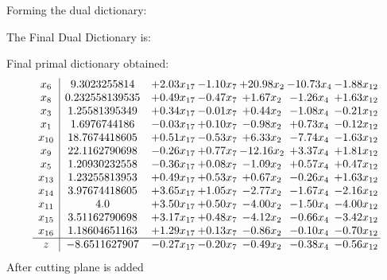 \documentclass[8pt]{article}
\begin{document}
Forming the dual dictionary:

The Final Dual Dictionary is: 

 Final primal dictionary obtained: 
\[\begin{array}{c| c c@{\hskip 2pt} c@{\hskip 2pt} c@{\hskip 2pt} c@{\hskip 2pt} c@{\hskip 2pt} }
 x_{6}   &  9.3023255814 & +  2.03 x_{17} & -1.10 x_{7} & + 20.98 x_{2} & -10.73 x_{4} & -1.88 x_{12}\\
 x_{8}   &  0.232558139535 & +  0.49 x_{17} & -0.47 x_{7} & +  1.67 x_{2} & -1.26 x_{4} & +  1.63 x_{12}\\
 x_{3}   &  1.25581395349 & +  0.34 x_{17} & -0.01 x_{7} & +  0.44 x_{2} & -1.08 x_{4} & -0.21 x_{12}\\
 x_{1}   &  1.6976744186 & -0.03 x_{17} & +  0.10 x_{7} & -0.98 x_{2} & +  0.73 x_{4} & -0.12 x_{12}\\
 x_{10}   &  18.7674418605 & +  0.51 x_{17} & -0.53 x_{7} & +  6.33 x_{2} & -7.74 x_{4} & -1.63 x_{12}\\
 x_{9}   &  22.1162790698 & -0.26 x_{17} & +  0.77 x_{7} & -12.16 x_{2} & +  3.37 x_{4} & +  1.81 x_{12}\\
 x_{5}   &  1.20930232558 & -0.36 x_{17} & +  0.08 x_{7} & -1.09 x_{2} & +  0.57 x_{4} & +  0.47 x_{12}\\
 x_{13}   &  1.23255813953 & +  0.49 x_{17} & +  0.53 x_{7} & +  0.67 x_{2} & -0.26 x_{4} & +  1.63 x_{12}\\
 x_{14}   &  3.97674418605 & +  3.65 x_{17} & +  1.05 x_{7} & -2.77 x_{2} & -1.67 x_{4} & -2.16 x_{12}\\
 x_{11}   &  4.0 & +  3.50 x_{17} & +  0.50 x_{7} & -4.00 x_{2} & -1.50 x_{4} & -4.00 x_{12}\\
 x_{15}   &  3.51162790698 & +  3.17 x_{17} & +  0.48 x_{7} & -4.12 x_{2} & -0.66 x_{4} & -3.42 x_{12}\\
 x_{16}   &  1.18604651163 & +  1.29 x_{17} & +  0.13 x_{7} & -0.86 x_{2} & -0.10 x_{4} & -0.70 x_{12}\\
\hline
z    &  -8.6511627907 & -0.27 x_{17} & -0.20 x_{7} & -0.49 x_{2} & -0.38 x_{4} & -0.56 x_{12}\\
\end{array}\]
 After cutting plane is added 
\end{document}
